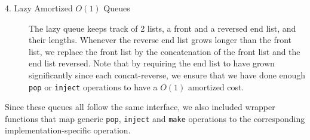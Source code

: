 \begin{description}
\item[4. Lazy Amortized $O(1)$ Queues]

The lazy queue keeps track of 2 lists, a front and a reversed end list, and their lengths. Whenever the reverse end list grows longer than the front list, we replace the front list by the concatenation of the front list and the end list reversed. 
Note that by requiring the end list to have grown significantly since each concat-reverse, we ensure that we have done enough \texttt{pop} or \texttt{inject} operations to have a $O(1)$ amortized cost.

\end{description}

Since these queues all follow the same interface, we also included wrapper functions that map generic \texttt{pop}, \texttt{inject} and \texttt{make} operations to the corresponding implementation-specific operation.